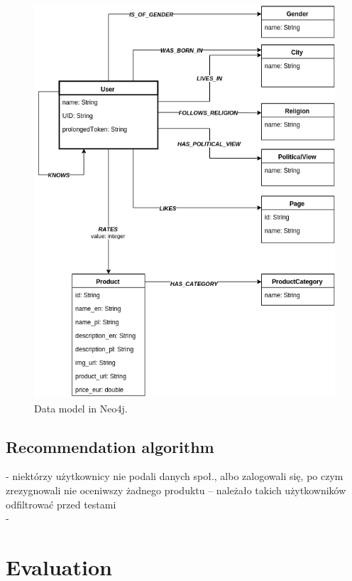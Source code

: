 \documentclass[12pt]{report}
\begin{document}
\begin{figure}[!t]
\centering
\includegraphics[width=\textwidth]{neo4j_data_model3.png} 
\caption[Data model in Neo4j.]{Data model in Neo4j.}
\label{fig.data_model}
\end{figure}

\section{Recommendation algorithm}

- niektórzy użytkownicy nie podali danych społ., albo zalogowali się, po czym zrezygnowali nie oceniwszy żadnego produktu -- należało takich użytkowników odfiltrować przed testami\\

-

\chapter{Evaluation}
\end{document}
